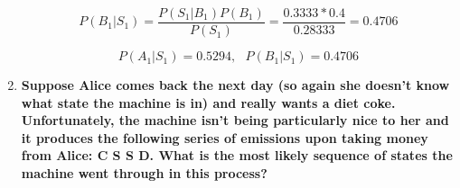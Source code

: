 \documentclass[fleqn]{hermans-hw}
\begin{document}
\begin{enumerate}
  $$P(B_1 | S_1) = \frac{P(S_1 | B_1) P(B_1)}{P(S_1)} = \frac{0.3333 * 0.4}{0.28333} = 0.4706$$
  
  $$\boxed{P(A_1 | S_1) = 0.5294, \ \ \ P(B_1 | S_1) = 0.4706}$$

\item {\bf Suppose Alice comes back the next day (so again she doesn't know
  what state the machine is in) and really wants a diet coke.
  Unfortunately, the machine isn't being particularly nice to her and
  it produces the following series of emissions upon taking money from
  Alice: C S S D.  What is the most likely sequence of states the
  machine went through in this process?}
\end{enumerate}
\end{document}
